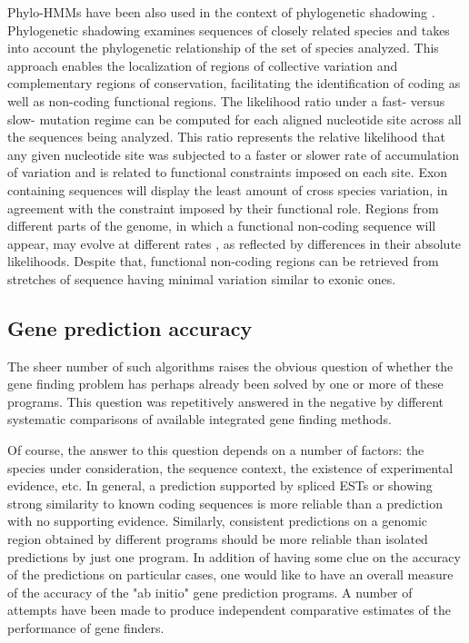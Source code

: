 Phylo-HMMs have been also used in the context of phylogenetic
shadowing \citep{boffelli:2003a}. Phylogenetic shadowing examines
sequences of closely related species and takes into account the
phylogenetic relationship of the set of species analyzed. This
approach enables the localization of regions of collective variation
and complementary regions of conservation, facilitating the
identification of coding as well as non-coding functional regions. The
likelihood ratio under a fast- versus slow- mutation regime can be
computed for each aligned nucleotide site across all the sequences
being analyzed. This ratio represents the relative likelihood that any
given nucleotide site was subjected to a faster or slower rate of
accumulation of variation and is related to functional constraints
imposed on each site. Exon containing sequences will display the least
amount of cross species variation, in agreement with the constraint
imposed by their functional role. Regions from different parts of the
genome, in which a functional non-coding sequence will appear, may
evolve at different rates \citep{eberseberger:2002a}, as reflected by
differences in their absolute likelihoods. Despite that, functional
non-coding regions can be retrieved from stretches of sequence having
minimal variation similar to exonic ones.

\subsection{Gene prediction accuracy}

The sheer number of such algorithms raises the obvious question of
whether the gene finding problem has perhaps already been solved by
one or more of these programs. This question was repetitively answered
in the negative by different systematic comparisons of available
integrated gene finding methods.

Of course, the answer to this question depends on a number of factors:
the species under consideration, the sequence context, the existence
of experimental evidence, etc. In general, a prediction supported by
spliced ESTs or showing strong similarity to known coding sequences is
more reliable than a prediction with no supporting evidence.
Similarly, consistent predictions on a genomic region obtained by
different programs should be more reliable than isolated predictions
by just one program. In addition of having some clue on the accuracy
of the predictions on particular cases, one would like to have an
overall measure of the accuracy of the "ab initio" gene prediction
programs. A number of attempts have been made to produce independent
comparative estimates of the performance of gene finders.

